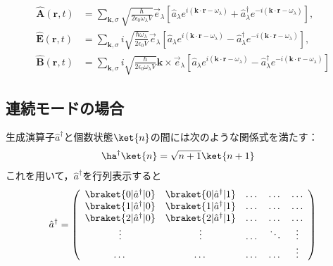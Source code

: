 \begin{align}
    \hat{\bm{A}}(\bm{r},t)&=
    \sum_{\bm{k},\sigma}\sqrt{\frac{\hbar}{2\epsilon_0\omega_{\lambda} V}}\vec{e}_{\lambda}
    \left[
    \hat{a}_{\lambda}e^{i(\bm{k}\cdot\bm{r}-\omega_{\lambda})}
    + \hat{a}^{\dagger}_{\lambda}e^{-i(\bm{k}\cdot\bm{r}-\omega_{\lambda})}
    \right],\\[10pt]
    \hat{\bm{E}}(\bm{r},t)&=
    \sum_{\bm{k},\sigma}i\sqrt{\frac{\hbar\omega_{\lambda}}{2\epsilon_0 V}}\vec{e}_{\lambda}
    \left[
    \hat{a}_{\lambda}e^{i(\bm{k}\cdot\bm{r}-\omega_{\lambda})}
    - \hat{a}^{\dagger}_{\lambda}e^{-i(\bm{k}\cdot\bm{r}-\omega_{\lambda})}
    \right],\\[10pt]
    \hat{\bm{B}}(\bm{r},t)&=
    \sum_{\bm{k},\sigma}i\sqrt{\frac{\hbar}{2\epsilon_0\omega_{\lambda} V}}\bm{k}\times\vec{e}_{\lambda}
    \left[
    \hat{a}_{\lambda}e^{i(\bm{k}\cdot\bm{r}-\omega_{\lambda})}
    - \hat{a}^{\dagger}_{\lambda}e^{-i(\bm{k}\cdot\bm{r}-\omega_{\lambda})}
    \right]
\end{align}


\subsection{連続モードの場合}










生成演算子$\hat{a}^{\dagger}$と個数状態$\ket{n}$の間には次のような関係式を満たす：
\begin{align}
    \ha^\dag\ket{n}&=\sqrt{n+1}\ket{n+1}
\end{align}
これを用いて，$\hat{a}^{\dagger}$を行列表示すると
\begin{align}
    \hat{a}^{\dagger}=
    \left(
    \begin{array}{ccccc}
   \braket{0|\hat{a}^{\dagger}|0} & \braket{0|\hat{a}^{\dagger}|1}& \dots& \dots  & \dots\\
  \braket{1|\hat{a}^{\dagger}|0} &\braket{1|\hat{a}^{\dagger}|1}& \dots& \dots  & \dots\\
  \braket{2|\hat{a}^{\dagger}|0} &\braket{2|\hat{a}^{\dagger}|1}& \dots& \dots  & \dots\\
  \vdots & \vdots & \dots& \ddots & \vdots \\
  \dots & \dots& \dots& \dots  & \vdots
    \end{array}
    \right)
\end{align}

